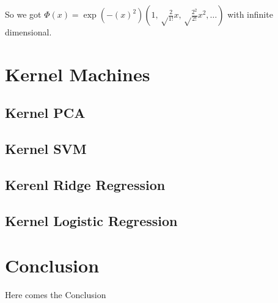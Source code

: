 \documentclass[12pt]{article}
\theoremstyle{definition}
\theoremstyle{remark}
\begin{document}
So we got \(\Phi(x) = \exp(-{(x)}^{2})(1, \sqrt\frac{2}{1!}x, \sqrt\frac{2^{2}}{2!}x^{2}, \dots)\) with infinite dimensional.

\section{Kernel Machines}
\subsection{Kernel PCA}
\subsection{Kernel SVM}
\subsection{Kerenl Ridge Regression}
\subsection{Kernel Logistic Regression}


\section{Conclusion}
Here comes the Conclusion






\end{document}
